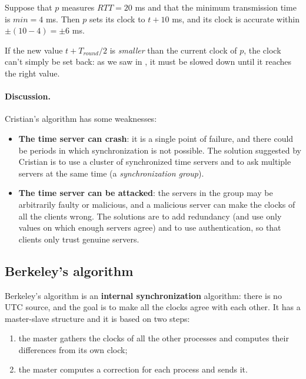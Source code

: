 \begin{framedex}{}
  Suppose that $p$ measures $RTT = 20$ ms and that the minimum transmission time is $\textit{min} = 4$ ms. Then $p$ sets its clock to $t + 10$ ms, and its clock is accurate within $\pm (10 - 4) = \pm 6$ ms.
\end{framedex}

\begin{framedobs}{}
  If the new value $t + T_{round}/2$ is \textit{smaller} than the current clock of $p$, the clock can't simply be set back: as we saw in , it must be slowed down until it reaches the right value.
\end{framedobs}

\paragraph{Discussion.} Cristian's algorithm has some weaknesses:
\begin{itemize}
  \item \textbf{The time server can crash}: it is a single point of failure, and there could be periods in which synchronization is not possible. The solution suggested by Cristian is to use a cluster of synchronized time servers and to ask multiple servers at the same time (a \textit{synchronization group}).
  \item \textbf{The time server can be attacked}: the servers in the group may be arbitrarily faulty or malicious, and a malicious server can make the clocks of all the clients wrong. The solutions are to add redundancy (and use only values on which enough servers agree) and to use authentication, so that clients only trust genuine servers.
\end{itemize}

\subsection{Berkeley's algorithm}

Berkeley's algorithm is an \textbf{internal synchronization} algorithm: there is no UTC source, and the goal is to make all the clocks agree with each other. It has a master-slave structure and it is based on two steps:
\begin{enumerate}
  \item the master gathers the clocks of all the other processes and computes their differences from its own clock;
  \item the master computes a correction for each process and sends it.
\end{enumerate}


